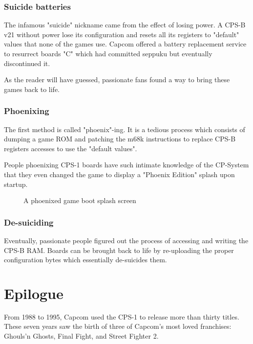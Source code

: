 \subsubsection{Suicide batteries}
The infamous "suicide" nickname came from the effect of losing power. A CPS-B v21 without power lose its configuration and resets all its registers to "default" values that none of the games use. Capcom offered a battery replacement service to resurrect boards "C" which had committed seppuku but eventually discontinued it. 

As the reader will have guessed, passionate fans found a way to bring these games back to life.

\subsubsection{Phoenixing}
The first method is called "phoenix"-ing. It is a tedious process which consists of dumping a game ROM and patching the m68k instructions to replace CPS-B registers accesses to use the "default values"\cite{csp1_phoenix}. 

People phoenixing CPS-1 boards have such intimate knowledge of the CP-System that they even changed the game to display a "Phoenix Edition" splash upon startup.

\begin{figure}[H]
\caption*{A phoenixed game boot splash screen}
\end{figure}


\subsubsection{De-suiciding}
Eventually, passionate people figured out the process of accessing and writing the CPS-B RAM. Boards can be brought back to life by re-uploading the proper configuration bytes which essentially de-suicides them\cite{arcadeHackerCPS1Desuicide}.







\section{Epilogue}
From 1988 to 1995, Capcom used the CPS-1 to release more than thirty titles. These seven years saw the birth of three of Capcom's most loved franchises: Ghouls’n Ghosts, Final Fight, and Street Fighter 2.

